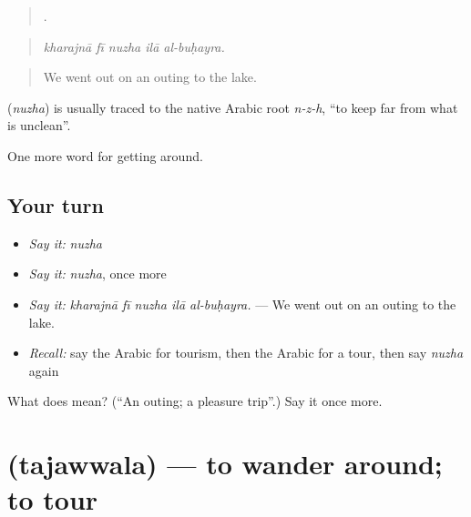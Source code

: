 \begin{quote}
    .
\end{quote}

\begin{quote}
\emph{kharajnā fī nuzha ilā al-buḥayra.}
\end{quote}

\begin{quote}
We went out on an outing to the lake.
\end{quote}

\begin{cousinweb}
\textbf{} (\emph{nuzha}) is usually traced to the native Arabic root \emph{n-z-h}, \textquotedblleft{}to keep far from what is unclean\textquotedblright{}.
\end{cousinweb}

\begin{grammarlens}[title={What you've built}]
One more word for getting around.
\end{grammarlens}

\subsection*{Your turn}
\begin{itemize}
\raggedright
  \item \emph{Say it:} \emph{nuzha}
  \item \emph{Say it:} \emph{nuzha}, once more
  \item \emph{Say it:} \emph{kharajnā fī nuzha ilā al-buḥayra.} — We went out on an outing to the lake.
  \item \emph{Recall:} say the Arabic for tourism, then the Arabic for a tour, then say \emph{nuzha} again
\end{itemize}

\begin{tcolorbox}[breakable,colback=teal!4,colframe=teal!35!black,title={Before you move on}]
What does  mean? (\textquotedblleft{}An outing; a pleasure trip\textquotedblright{}.) Say it once more.
\end{tcolorbox}
\section[\texorpdfstring{\ar{تجول} (tajawwala)}{تجول (tajawwala)}]{ (tajawwala) — to wander around; to tour}

\label{lesson:AR-C438-tajawwala}



